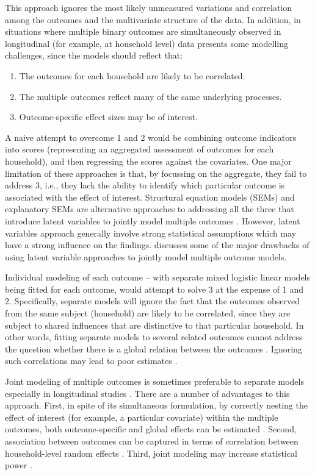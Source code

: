 This approach ignores the most likely unmeasured variations and correlation among the outcomes and the multivariate structure of the data. In addition, in situations where multiple binary outcomes are simultaneously observed in longitudinal (for example, at household level) data presents some modelling challenges, since the models should reflect that:
\begin{enumerate}
\item The outcomes for each household are likely to be correlated.
\item The multiple outcomes reflect many of the same underlying processes.
\item Outcome-specific effect sizes may be of interest.
\end{enumerate}
A naive attempt to overcome 1 and 2 would be combining outcome indicators into scores (representing an aggregated assessment of outcomes for each household), and then regressing the scores against the covariates. One major limitation of these approaches is that, by focussing on the aggregate, they fail to address 3, i.e., they lack the ability to identify which particular outcome is associated with the effect of interest. Structural equation models (SEMs) and explanatory SEMs are alternative approaches to addressing all the three that introduce latent variables to jointly model multiple outcomes \citep{dassimultaneous, fang2018joint, ivanova2016mixed, miro2004bayesian,lalonde2019disc}. However, latent variables approach generally involve strong statistical assumptions which may have a strong influence on the findings. \citet{lalonde2019disc} discusses some of the major drawbacks of using latent variable approaches to jointly model multiple outcome models.

Individual modeling of each outcome -- with separate mixed logistic linear models being fitted for each outcome, would attempt to solve 3 at the expense of 1 and 2. Specifically, separate models will ignore the fact that the outcomes observed from the same subject (household) are likely to be correlated, since they are subject to shared influences that are distinctive to that particular household. In other words, fitting separate models to several related outcomes cannot address the question whether there is a global relation between the outcomes \citep{lalonde2019disc}. Ignoring such correlations may lead to poor estimates \citep{dassimultaneous, fang2018joint, ivanova2016mixed, miro2004bayesian, lalonde2019disc}.

Joint modeling of multiple outcomes is sometimes preferable to separate models especially in longitudinal studies \citep{dassimultaneous,fang2018joint,lalonde2019disc}. There are a number of advantages to this approach. First, in spite of its simultaneous formulation, by correctly nesting the effect of interest (for example, a particular covariate) within the multiple outcomes, both outcome-specific and global effects can be estimated \citep{dassimultaneous,lalonde2019disc}. Second, association between outcomes can be captured in terms of correlation between household-level random effects \citep{ivanova2016mixed}. Third, joint modeling may increase statistical power \citep{dassimultaneous}.

